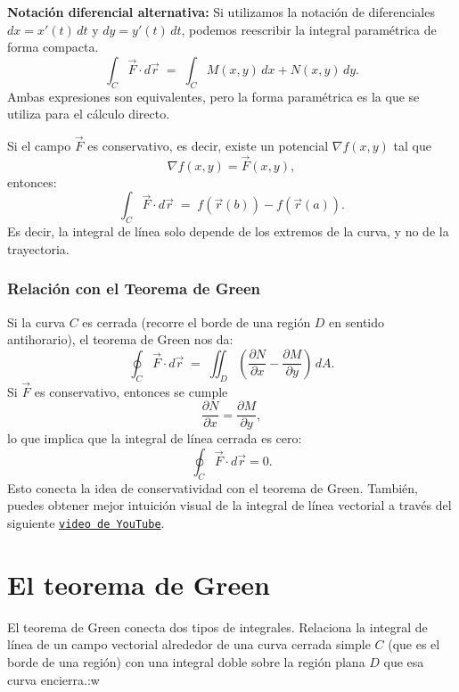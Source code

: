 \textbf{Notación diferencial alternativa:}
Si utilizamos la notación de diferenciales $dx = x'(t)\,dt$ y $dy = y'(t)\,dt$, podemos reescribir la integral paramétrica de forma compacta. 
$$
\int_C \vec{F}\cdot d\vec{r} \;=\; \int_C M(x,y)\,dx + N(x,y)\,dy.
$$
Ambas expresiones son equivalentes, pero la forma paramétrica es la que se utiliza para el cálculo directo.

Si el campo $\vec{F}$ es conservativo, es decir, existe un potencial $\nabla f(x,y)$ tal que
$$
\nabla f(x,y) = \vec{F}(x,y),
$$
entonces:
$$
\int_C \vec{F}\cdot d\vec{r} \;=\; f(\vec{r}(b)) - f(\vec{r}(a)).
$$
Es decir, la integral de línea solo depende de los extremos de la curva, y no de la trayectoria.

\subsubsection{Relación con el Teorema de Green}

Si la curva $C$ es cerrada (recorre el borde de una región $D$ en sentido antihorario), el teorema de Green nos da:
$$
\oint_C \vec{F}\cdot d\vec{r} \;=\; \iint_D \left( \frac{\partial N}{\partial x} - \frac{\partial M}{\partial y} \right)\, dA.
$$
Si $\vec{F}$ es conservativo, entonces se cumple
$$
\frac{\partial N}{\partial x} = \frac{\partial M}{\partial y},
$$
lo que implica que la integral de línea cerrada es cero:
$$
\oint_C \vec{F}\cdot d\vec{r} = 0.
$$
Esto conecta la idea de conservatividad con el teorema de Green. También, puedes obtener mejor intuición visual de la integral de línea vectorial a través del siguiente \href{https://youtu.be/eNUwFNg2yEQ?si=v1UCN24Bqt7mTakh}{\texttt{video de YouTube}}.

\section{El teorema de Green}

El teorema de Green conecta dos tipos de integrales. Relaciona la integral de línea de un campo vectorial alrededor de una curva cerrada simple $C$ (que es el borde de una región) con una integral doble sobre la región plana $D$ que esa curva encierra.:w

